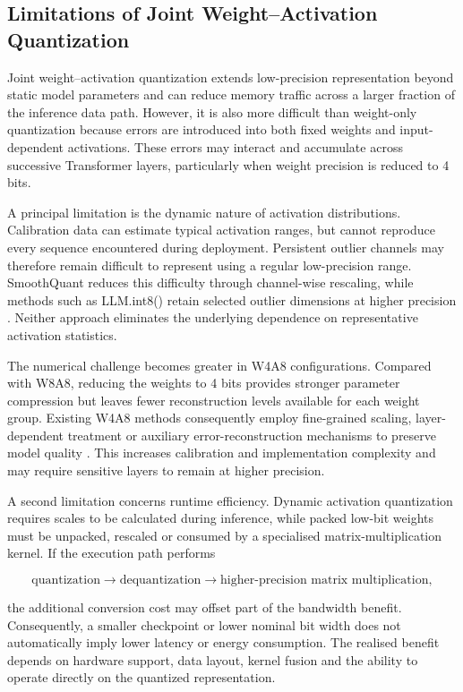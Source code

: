 \subsection{Limitations of Joint Weight--Activation Quantization}
\label{subsec:joint-wa-limitations}

Joint weight--activation quantization extends low-precision
representation beyond static model parameters and can reduce memory
traffic across a larger fraction of the inference data path. However,
it is also more difficult than weight-only quantization because errors
are introduced into both fixed weights and input-dependent activations.
These errors may interact and accumulate across successive Transformer
layers, particularly when weight precision is reduced to 4 bits.

A principal limitation is the dynamic nature of activation
distributions. Calibration data can estimate typical activation ranges,
but cannot reproduce every sequence encountered during deployment.
Persistent outlier channels may therefore remain difficult to represent
using a regular low-precision range. SmoothQuant reduces this difficulty
through channel-wise rescaling, while methods such as LLM.int8() retain
selected outlier dimensions at higher precision
\cite{xiao2023smoothquant,dettmers2022gpt3int8}. Neither approach
eliminates the underlying dependence on representative activation
statistics.

The numerical challenge becomes greater in W4A8 configurations.
Compared with W8A8, reducing the weights to 4 bits provides stronger
parameter compression but leaves fewer reconstruction levels available
for each weight group. Existing W4A8 methods consequently employ
fine-grained scaling, layer-dependent treatment or auxiliary
error-reconstruction mechanisms to preserve model quality
\cite{li2023fptq,wu2023zeroquantfp,zhang2024lqer}. This increases
calibration and implementation complexity and may require sensitive
layers to remain at higher precision.

A second limitation concerns runtime efficiency. Dynamic activation
quantization requires scales to be calculated during inference, while
packed low-bit weights must be unpacked, rescaled or consumed by a
specialised matrix-multiplication kernel. If the execution path performs

\[
\text{quantization}
\rightarrow
\text{dequantization}
\rightarrow
\text{higher-precision matrix multiplication},
\]

the additional conversion cost may offset part of the bandwidth benefit.
Consequently, a smaller checkpoint or lower nominal bit width does not
automatically imply lower latency or energy consumption. The realised
benefit depends on hardware support, data layout, kernel fusion and the
ability to operate directly on the quantized representation.

